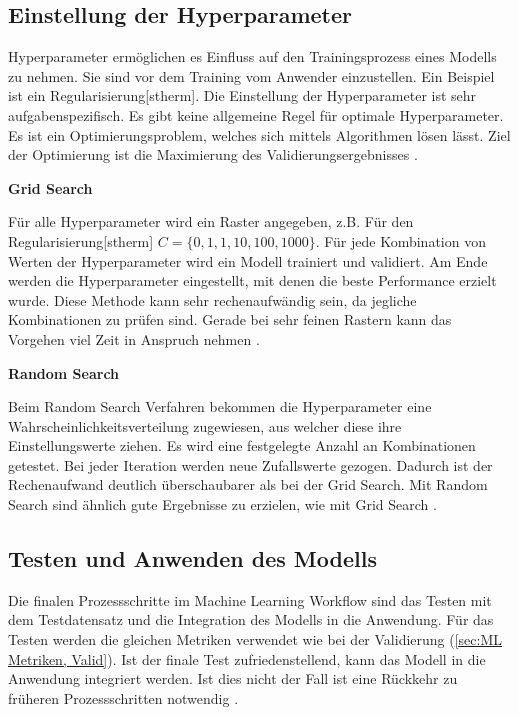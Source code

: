 
\subsection{Einstellung der Hyperparameter} \label{sec:ML HyperPara}
\gls{Hyperparameter} ermöglichen es Einfluss auf den Trainingsprozess eines Modells zu nehmen. Sie sind vor dem Training vom Anwender einzustellen. Ein Beispiel ist ein \gls{Regularisierung}[stherm]. Die Einstellung der \gls{Hyperparameter} ist sehr aufgabenspezifisch. Es gibt keine allgemeine Regel für optimale \gls{Hyperparameter}. Es ist ein Optimierungsproblem, welches sich mittels Algorithmen lösen lässt. Ziel der Optimierung ist die Maximierung des Validierungsergebnisses \cite{Zheng.2015}.\dubpar


\textbf{Grid Search}\par

Für alle \gls{Hyperparameter} wird ein Raster angegeben, z.B. Für den \gls{Regularisierung}[stherm] \(C = \{0,1,1,10,100,1000\}\). Für jede Kombination von Werten der \gls{Hyperparameter} wird ein Modell trainiert und validiert. Am Ende werden die \gls{Hyperparameter} eingestellt, mit denen die beste Performance erzielt wurde. Diese Methode kann sehr rechenaufwändig sein, da jegliche Kombinationen zu prüfen sind. Gerade bei sehr feinen Rastern kann das Vorgehen viel Zeit in Anspruch nehmen \cite{Zheng.2015}.\dubpar

\textbf{Random Search}\par

Beim Random Search Verfahren bekommen die \gls{Hyperparameter} eine Wahrscheinlichkeitsverteilung zugewiesen, aus welcher diese ihre Einstellungswerte ziehen. Es wird eine festgelegte Anzahl an Kombinationen getestet. Bei jeder Iteration werden neue Zufallswerte gezogen. Dadurch ist der Rechenaufwand deutlich überschaubarer als bei der Grid Search. Mit Random Search sind ähnlich gute Ergebnisse zu erzielen, wie mit Grid Search \cite{Zheng.2015, Burkov.2019}.


\subsection{Testen und Anwenden des Modells}
Die finalen Prozessschritte im \gls{Machine Learning Workflow} sind das Testen mit dem \gls{Testdatensatz} und die Integration des Modells in die Anwendung. Für das Testen werden die gleichen Metriken verwendet wie bei der Validierung (\ref{sec:ML Metriken, Valid}). Ist der finale Test zufriedenstellend, kann das Modell in die Anwendung integriert werden. Ist dies nicht der Fall ist eine Rückkehr zu früheren Prozessschritten notwendig \cite{Zheng.2015, Burkov.2019}.